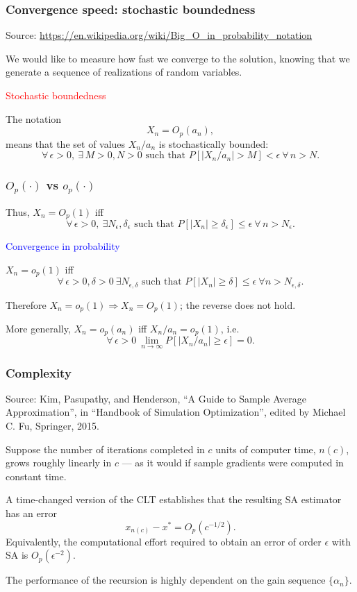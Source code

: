 \documentclass[usepdftitle=false, aspectratio=169]{beamer}
\begin{document}
\begin{frame}
\frametitle{Convergence speed: stochastic boundedness}

Source: \url{https://en.wikipedia.org/wiki/Big_O_in_probability_notation}

\mbox{}

We would like to measure how fast we converge to the solution, knowing that we generate a sequence of realizations of random variables.

\mbox{}

\textcolor{red}{Stochastic boundedness}

The notation
$$
X_{n}=O_{p}(a_{n}),
$$
means that the set of values $X_n/a_n$ is stochastically bounded:
$$
\forall\, \epsilon > 0,\ \exists\, M > 0, N > 0 \text{ such that } P[|X_{n}/a_{n}|>M ] < \epsilon \ \forall\, n > N.
$$

\end{frame}

\begin{frame}
\frametitle{$O_p(\cdot)$ vs $o_p(\cdot)$}

Thus, $X_n = O_p(1)$ iff
$$
\forall\, \epsilon > 0,\ \exists N_{\epsilon}, \delta_{\epsilon} \text{ such that } P[|X_{n} | \geq \delta_{\epsilon }] \leq \epsilon \ \forall\, n > N_{\epsilon}.
$$

\mbox{}

\textcolor{blue}{Convergence in probability}

$X_n = o_p(1)$ iff
$$
\forall\, \epsilon > 0, \delta > 0 \ \exists N_{\epsilon ,\delta } \text{ such that } P[|X_{n}|\geq \delta] \leq \epsilon \ \forall n > N_{\epsilon, \delta}.
$$

\mbox{}

Therefore $X_n = o_p(1) \Rightarrow X_n = O_p(1)$; the reverse does not hold.

More generally, $X_n = o_p(a_n)$ iff $X_n/{a_n} = o_p(1)$, i.e.
$$
\forall\, \epsilon > 0\ \lim_{n \rightarrow \infty} P[ |X_{n}/{a_n}| \geq \epsilon ] = 0.
$$

\end{frame}

\begin{frame}
\frametitle{Complexity}

Source: Kim, Pasupathy, and Henderson, ``A Guide to Sample Average Approximation'', in ``Handbook of Simulation Optimization'', edited by Michael C. Fu, Springer, 2015.

\mbox{}

Suppose the number of iterations completed in $c$ units of computer time, $n(c)$, grows roughly linearly in $c$ --- as it would if sample gradients were computed in constant time.

A time-changed version of the CLT establishes that the resulting SA estimator has
an error
$$
x_{n(c)} - x^* = O_p(c^{-1/2}).
$$
Equivalently, the computational effort required to obtain an error of order $\epsilon$ with SA is $O_p(\epsilon^{-2})$.

\mbox{}

The performance of the recursion is highly dependent on the gain sequence $\{ \alpha_n \}$.

\end{frame}
\end{document}
